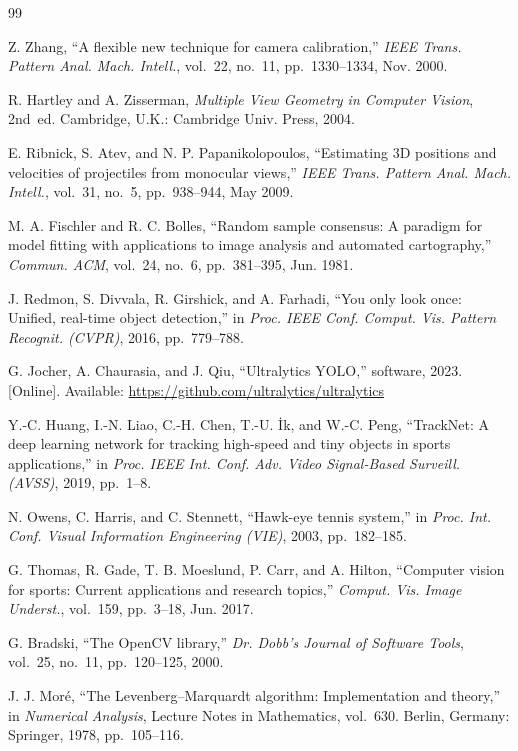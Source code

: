 \documentclass[journal]{IEEEtran}
\begin{document}
\begin{thebibliography}{99}

Z. Zhang, ``A flexible new technique for camera calibration,''
\emph{IEEE Trans. Pattern Anal. Mach. Intell.}, vol.~22, no.~11,
pp.~1330--1334, Nov. 2000.

R. Hartley and A. Zisserman, \emph{Multiple View Geometry in Computer Vision},
2nd~ed. Cambridge, U.K.: Cambridge Univ. Press, 2004.

E. Ribnick, S. Atev, and N. P. Papanikolopoulos, ``Estimating 3D positions and
velocities of projectiles from monocular views,''
\emph{IEEE Trans. Pattern Anal. Mach. Intell.}, vol.~31, no.~5, pp.~938--944,
May 2009.

M. A. Fischler and R. C. Bolles, ``Random sample consensus: A paradigm for model
fitting with applications to image analysis and automated cartography,''
\emph{Commun. ACM}, vol.~24, no.~6, pp.~381--395, Jun. 1981.

J. Redmon, S. Divvala, R. Girshick, and A. Farhadi, ``You only look once:
Unified, real-time object detection,'' in \emph{Proc. IEEE Conf. Comput. Vis.
Pattern Recognit. (CVPR)}, 2016, pp.~779--788.

G. Jocher, A. Chaurasia, and J. Qiu, ``Ultralytics YOLO,'' software, 2023.
[Online]. Available: \url{https://github.com/ultralytics/ultralytics}

Y.-C. Huang, I.-N. Liao, C.-H. Chen, T.-U. \.Ik, and W.-C. Peng, ``TrackNet: A
deep learning network for tracking high-speed and tiny objects in sports
applications,'' in \emph{Proc. IEEE Int. Conf. Adv. Video Signal-Based Surveill.
(AVSS)}, 2019, pp.~1--8.

N. Owens, C. Harris, and C. Stennett, ``Hawk-eye tennis system,'' in
\emph{Proc. Int. Conf. Visual Information Engineering (VIE)}, 2003,
pp.~182--185.

G. Thomas, R. Gade, T. B. Moeslund, P. Carr, and A. Hilton, ``Computer vision for
sports: Current applications and research topics,''
\emph{Comput. Vis. Image Underst.}, vol.~159, pp.~3--18, Jun. 2017.

G. Bradski, ``The OpenCV library,'' \emph{Dr. Dobb's Journal of Software Tools},
vol.~25, no.~11, pp.~120--125, 2000.

J. J. Mor\'e, ``The Levenberg--Marquardt algorithm: Implementation and theory,''
in \emph{Numerical Analysis}, Lecture Notes in Mathematics, vol.~630. Berlin,
Germany: Springer, 1978, pp.~105--116.


\end{thebibliography}
\end{document}
